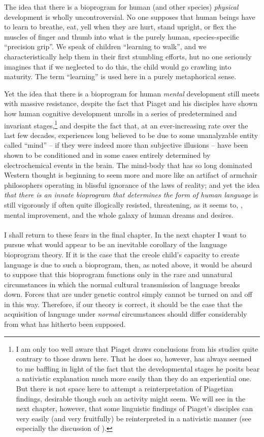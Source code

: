The idea that there is a bioprogram for human (and other species) \textit{physical} development is wholly uncontroversial. No one supposes that human beings have to learn to breathe, eat, yell when they are hurt, stand upright, or flex the muscles of finger and thumb into what is the purely human, species-specific ``precision grip''. We speak of children ``learning to walk'', and we characteristically help them in their first stumbling efforts, hut no one seriously imagines that if we neglected to do this, the child would go crawling into maturity. The term ``learning'' is used here in a purely metaphorical sense.

Yet the idea that there is a bioprogram for human \textit{mental} development still meets with massive resistance, despite the fact that Piaget and his disciples have shown how human cognitive development unrolls in a series of predetermined and invariant stages,\footnote{I am only too well aware that Piaget draws conclusions from his studies quite contrary to those drawn here. That he does so, however, has always seemed to me baffling in light of the fact that the developmental stages he posits bear a nativistic explanation much more easily than they do an experiential one. But there is not space here to attempt a reinterpretation of Piagetian findings, desirable though such an activity might seem. We will see in the next chapter, however, that some linguistic findings of Piaget's disciples can very easily (and very fruitfully) be reinterpreted in a nativistic manner (see especially the discussion of \citealt{BrockartEtAl1973}).} and despite
the fact that, at an ever-increasing rate over the last few decades, experiences long believed to be due to some unanalyzable entity called ``mind'' -- if they were indeed more than subjective illusions -- have been shown to be conditioned and in some cases entirely determined by electrochemical events in the brain. The mind-body  that has so long dominated Western thought is beginning to seem more and more like an artifact of armchair philosophers operating in blissful ignorance of the laws of reality; and yet the idea \textit{that there is an innate bioprogram that determines the form of human language} is still vigorously if often quite illogically resisted, threatening, as it seems to, , mental improvement, and the whole galaxy of human dreams and desires.\\\\

I shall return to these fears in the final chapter. In the next chapter I want to pursue what would appear to be an inevitable corollary of the language bioprogram theory. If it is the case that the creole child's capacity to create language is due to such a bioprogram, then, as noted above, it would be absurd to suppose that this bioprogram functions only in the rare and unnatural circumstances in which the normal cultural transmission of language breaks down. Forces that are under genetic control simply cannot be turned on and off in this way. Therefore, if our theory is correct, it should be the case that the acquisition of language under \textit{normal} circumstances should differ considerably from what has hitherto been supposed.

